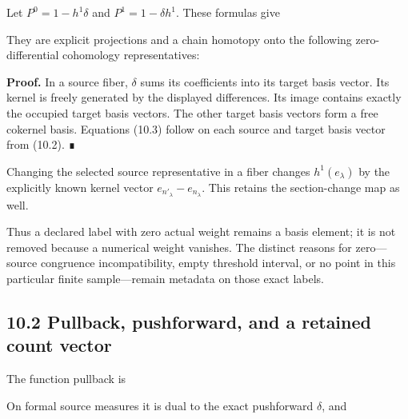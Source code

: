 
Let \(P^0=1-h^1\delta\) and \(P^1=1-\delta h^1\). These formulas give


They are explicit projections and a chain homotopy onto the following
zero-differential cohomology representatives:


\textbf{Proof.} In a source fiber, \(\delta\) sums its coefficients into
its target basis vector. Its kernel is freely generated by the displayed
differences. Its image contains exactly the occupied target basis
vectors. The other target basis vectors form a free cokernel basis.
Equations (10.3) follow on each source and target basis vector from
(10.2). ∎

Changing the selected source representative in a fiber changes
\(h^1(e_\lambda)\) by the explicitly known kernel vector
\(e_{n'_\lambda}-e_{n_\lambda}\). This retains the section-change map as
well.

Thus a declared label with zero actual weight remains a basis element;
it is not removed because a numerical weight vanishes. The distinct
reasons for zero---source congruence incompatibility, empty threshold
interval, or no point in this particular finite sample---remain metadata
on those exact labels.

\subsection{10.2 Pullback, pushforward, and a retained count vector}

The function pullback is


On formal source measures it is dual to the exact pushforward
\(\delta\), and


